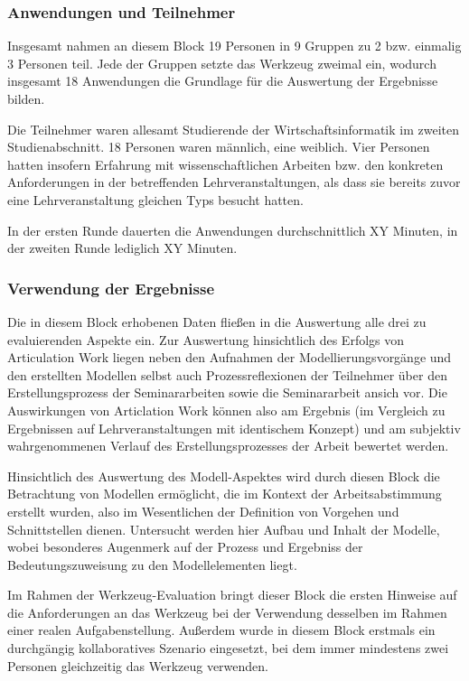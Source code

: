 \subsubsection{Anwendungen und Teilnehmer} %
\label{ssub:2_teilnehmer}

Insgesamt nahmen an diesem Block 19 Personen in 9 Gruppen zu 2 bzw. einmalig 3 Personen teil. Jede der Gruppen setzte das Werkzeug zweimal ein, wodurch insgesamt 18 Anwendungen die Grundlage für die Auswertung der Ergebnisse bilden.

Die Teilnehmer waren allesamt Studierende der Wirtschaftsinformatik im zweiten Studienabschnitt. 18 Personen waren männlich, eine weiblich. Vier Personen hatten insofern Erfahrung mit wissenschaftlichen Arbeiten bzw. den konkreten Anforderungen in der betreffenden Lehrveranstaltungen, als dass sie bereits zuvor eine Lehrveranstaltung gleichen Typs besucht hatten.

In der ersten Runde dauerten die Anwendungen durchschnittlich XY Minuten, in der zweiten Runde lediglich XY Minuten.


\subsubsection{Verwendung der Ergebnisse} %
\label{ssub:2_verwendung_der_ergebnisse}

Die in diesem Block erhobenen Daten fließen in die Auswertung alle drei zu evaluierenden Aspekte ein. Zur Auswertung hinsichtlich des Erfolgs von Articulation Work liegen neben den Aufnahmen der Modellierungsvorgänge und den erstellten Modellen selbst auch Prozessreflexionen der Teilnehmer über den Erstellungsprozess der Seminararbeiten sowie die Seminararbeit ansich vor. Die Auswirkungen von Articlation Work können also am Ergebnis (im Vergleich zu Ergebnissen auf Lehrveranstaltungen mit identischem Konzept) und am subjektiv wahrgenommenen Verlauf des Erstellungsprozesses der Arbeit bewertet werden.

Hinsichtlich des Auswertung des Modell-Aspektes wird durch diesen Block die Betrachtung von Modellen ermöglicht, die im Kontext der Arbeitsabstimmung erstellt wurden, also im Wesentlichen der Definition von Vorgehen und Schnittstellen dienen. Untersucht werden hier Aufbau und Inhalt der Modelle, wobei besonderes Augenmerk auf der Prozess und Ergebniss der Bedeutungszuweisung zu den Modellelementen liegt.

Im Rahmen der Werkzeug-Evaluation bringt dieser Block die ersten Hinweise auf die Anforderungen an das Werkzeug bei der Verwendung desselben im Rahmen einer realen Aufgabenstellung. Außerdem wurde in diesem Block erstmals ein durchgängig kollaboratives Szenario eingesetzt, bei dem immer mindestens zwei Personen gleichzeitig das Werkzeug verwenden.

